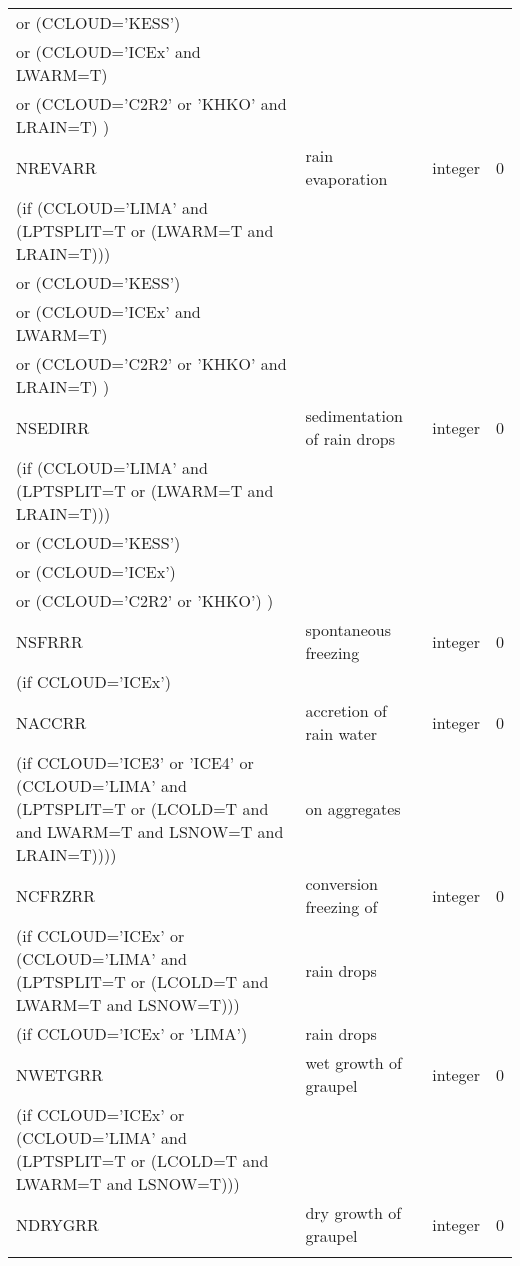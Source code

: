 \begin{longtable} {|p{}|p{}|>{\centering}p{}|p{}<{\centering}|}
 or (CCLOUD='KESS') & & & \\ \nopagebreak
 or (CCLOUD='ICEx' and LWARM=T) & & & \\ \nopagebreak
 or (CCLOUD='C2R2' or 'KHKO' and LRAIN=T) ) & & & \\ \hline
NREVARR & rain evaporation  & integer  &  0 \index{NREVARR!\innam{NAM\_BU\_RRR}}\\\hline
(if (CCLOUD='LIMA' and (LPTSPLIT=T or (LWARM=T and LRAIN=T))) & & & \\ \nopagebreak
 or (CCLOUD='KESS') & & & \\ \nopagebreak
 or (CCLOUD='ICEx' and LWARM=T) & & & \\ \nopagebreak
 or (CCLOUD='C2R2' or 'KHKO' and LRAIN=T) ) & & & \\ \hline
NSEDIRR   & sedimentation of rain drops& integer  &  0 \index{NSEDIRR!\innam{NAM\_BU\_RRR}}\\ \nopagebreak
(if (CCLOUD='LIMA' and (LPTSPLIT=T or (LWARM=T and LRAIN=T))) & & & \\ \nopagebreak
 or (CCLOUD='KESS') & & & \\ \nopagebreak
 or (CCLOUD='ICEx') & & & \\ \nopagebreak
 or (CCLOUD='C2R2' or 'KHKO') ) & & & \\ \hline
NSFRRR   & spontaneous freezing & integer  &  0 \index{NSFRRR!\innam{NAM\_BU\_RRR}}\\ \nopagebreak
(if CCLOUD='ICEx') & &   &  \\\hline
NACCRR   & accretion of rain water & integer  &  0 \index{NACCRR!\innam{NAM\_BU\_RRR}}\\ \nopagebreak
(if CCLOUD='ICE3' or 'ICE4' or (CCLOUD='LIMA' and (LPTSPLIT=T or (LCOLD=T and and LWARM=T and LSNOW=T and LRAIN=T)))) & on aggregates & & \\\hline
NCFRZRR  & conversion freezing of & integer  &  0 \index{NCFRZRR!\innam{NAM\_BU\_RRR}}\\ \nopagebreak
(if CCLOUD='ICEx' or (CCLOUD='LIMA' and (LPTSPLIT=T or (LCOLD=T and LWARM=T and LSNOW=T))) & rain drops & & \\\hline
(if CCLOUD='ICEx' or 'LIMA') & rain drops &   &  \\\hline
NWETGRR  & wet growth of graupel & integer  &  0 \index{NWETGRR!\innam{NAM\_BU\_RRR}}\\ \nopagebreak
(if CCLOUD='ICEx' or (CCLOUD='LIMA' and (LPTSPLIT=T or (LCOLD=T and LWARM=T and LSNOW=T))) & & & \\\hline
NDRYGRR  & dry growth of graupel & integer  &  0 \index{NDRYGRR!\innam{NAM\_BU\_RRR}}\\ \nopagebreak

\end{longtable}
